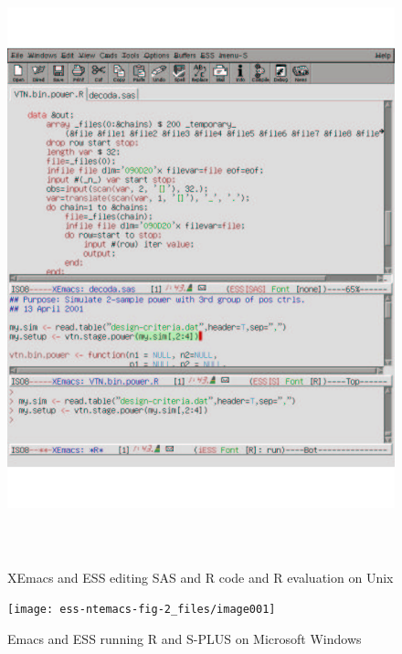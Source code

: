 \documentclass{article}
\begin{document}
\begin{figure}[htbp]
  \begin{center}
    \includegraphics[height=7.0in,width=6.0in]{ess-xemacs-fig-1}
    \caption{XEmacs and ESS editing SAS and R code and R evaluation on
      Unix}
    \label{fig:1}
  \end{center}
\end{figure}

\clearpage

\begin{figure}[htbp]
  \begin{center}
    \texttt{[image: ess-ntemacs-fig-2\_files/image001]}
    \caption{Emacs and ESS running R and S-PLUS on Microsoft Windows}
    \label{fig:2}
  \end{center}
\end{figure}
\end{document}
